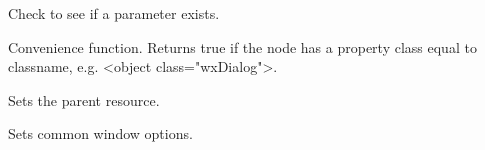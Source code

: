\label{wxxmlresourcehandlerhasparam}


Check to see if a parameter exists.

\label{wxxmlresourcehandlerisofclass}


Convenience function. Returns true if the node has a property class equal to classname,
e.g. <object class="wxDialog">.

\label{wxxmlresourcehandlersetparentresource}


Sets the parent resource.

\label{wxxmlresourcehandlersetupwindow}


Sets common window options.

